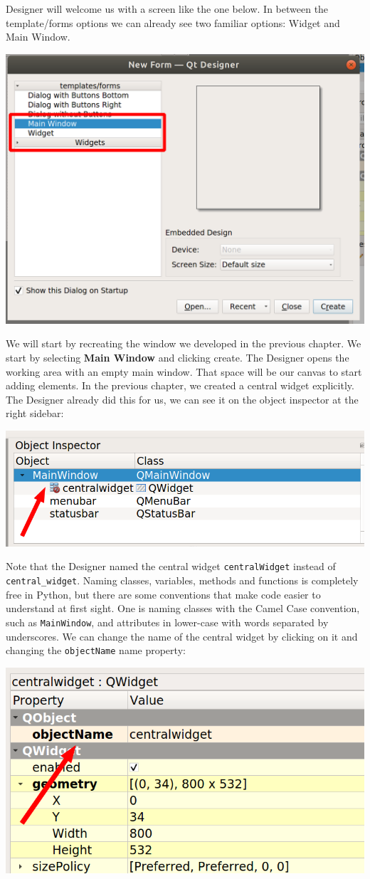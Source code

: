 Designer will welcome us with a screen like the one below. In between the template/forms options we can already see two familiar options: Widget and Main Window.

\begin{center}
    \includegraphics[width=.5\textwidth]{images/Chapter_09/01_Designer_Welcome.png}
\end{center}

We will start by recreating the window we developed in the previous chapter. We start by selecting \textbf{Main Window} and clicking create. The Designer opens the working area with an empty main window. That space will be our canvas to start adding elements. In the previous chapter, we created a central widget explicitly. The Designer already did this for us, we can see it on the object inspector at the right sidebar:

\begin{center}
    \includegraphics[width=.5\textwidth]{images/Chapter_09/02_central_widget.png}
\end{center}

Note that the Designer named the central widget \texttt{centralWidget} instead of \texttt{central\_widget}. Naming classes, variables, methods and functions is completely free in Python, but there are some conventions that make code easier to understand at first sight. One is naming classes with the Camel Case convention, such as \texttt{MainWindow}, and attributes in lower-case with words separated by underscores. We can change the name of the central widget by clicking on it and changing the \texttt{objectName} name property:

\begin{center}
    \includegraphics[width=.5\textwidth]{images/Chapter_09/03_central_widget_name.png}
\end{center}


